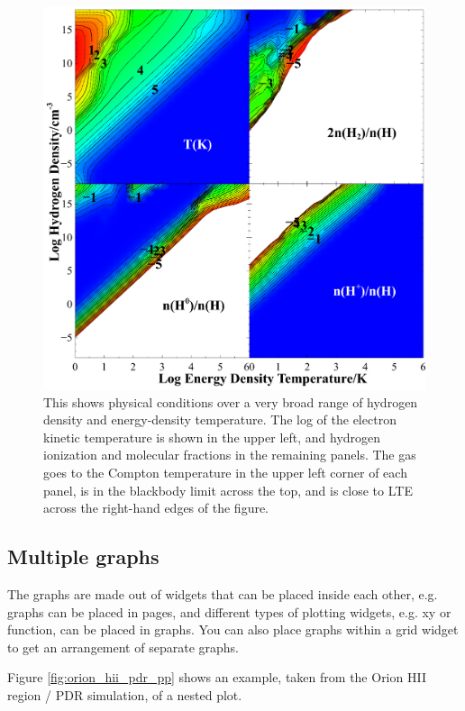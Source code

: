 \begin{figure}
\begin{center}
\includegraphics[clip=on,width=0.9\columnwidth,height=0.7\textheight,keepaspectratio]{grid_extreme}
\end{center}
\caption{This shows physical conditions over a very broad range of hydrogen density 
and energy-density temperature.  
The log of the electron kinetic temperature is shown in the upper left,
and hydrogen ionization and molecular fractions in the remaining panels.
The gas goes to the Compton temperature in the 
upper left corner of each panel, is in the blackbody limit across the top, and is close to LTE 
across the right-hand edges of the figure.}
\label{fig:grid_extreme}
\end{figure}

\subsection{Multiple graphs}

The graphs are made out of widgets that can be placed inside each other, e.g. 
graphs can be placed in pages, and different types of plotting widgets, e.g. xy or function, 
can be placed in graphs. 
You can also place graphs within a grid widget to get an arrangement of separate graphs.

Figure \ref{fig:orion_hii_pdr_pp} shows an example, 
taken from the Orion HII region / PDR simulation, of a nested plot.

